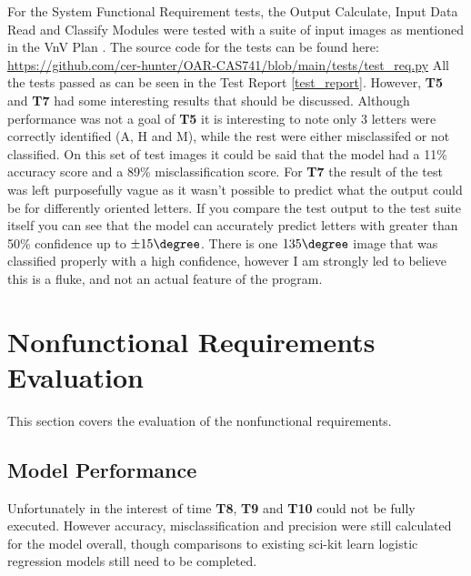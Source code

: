 \documentclass[12pt, titlepage]{article}
\begin{document}
For the System Functional Requirement tests, the Output Calculate, Input Data Read and Classify Modules were tested
with a suite of input images as mentioned in the VnV Plan \cite{VnV_plan}. The source code for the tests can be found here:
\url{https://github.com/cer-hunter/OAR-CAS741/blob/main/tests/test_req.py}
All the tests passed as can be seen in the Test Report \ref{test_report}.
However, \textbf{T5} and \textbf{T7} had some interesting results that should be discussed.
Although performance was not a goal of \textbf{T5} it is interesting to note only 3 letters were correctly identified (A, H and M), while the
rest were either misclassifed or not classified. On this set of test images it could be said that the model had a 11\% accuracy score and a 89\% misclassification score.
For \textbf{T7} the result of the test was left purposefully vague as it wasn't possible to predict what the output could be for differently oriented letters.
If you compare the test output to the test suite itself you can see that the model can accurately predict letters with greater than 50\% confidence 
up to $\pm 15\degree$. There is one $135\degree$ image that was classified properly with a high confidence, however I am strongly led to believe
this is a fluke, and not an actual feature of the program.

\section{Nonfunctional Requirements Evaluation}

This section covers the evaluation of the nonfunctional requirements.
		
\subsection{Model Performance}

Unfortunately in the interest of time \textbf{T8}, \textbf{T9} and \textbf{T10} could not be fully executed. However
accuracy, misclassification and precision were still calculated for the model overall, though
comparisons to existing sci-kit learn logistic regression models still need to be completed.
\end{document}
